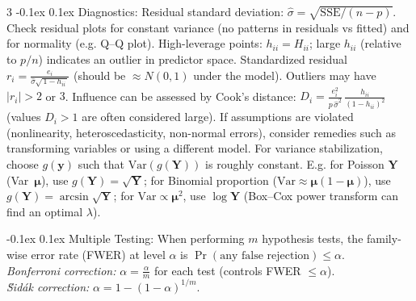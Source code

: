 \documentclass[10pt]{article}
\makeatletter
\renewcommand{\section}{\@startsection{section}{1}{0mm}
  {-0.1ex}%
  {0.1ex}%
  {\normalfont\normalsize\bfseries\color{thm-color}}}
\newcommand{\vect}[1]{\symbf{#1}} %
\makeatother
\begin{document}
\begin{multicols}{3}
  \section{Diagnostics:}
  Residual standard deviation: \( \hat{\sigma} = \sqrt{\mathrm{SSE}/(n-p)}. \)
  Check residual plots for constant variance (no patterns in residuals vs fitted) and for normality (e.g. Q--Q plot).
  High-leverage points: \( h_{ii} = H_{ii} \); large \( h_{ii} \) (relative to \( p/n \)) indicates an outlier in predictor space.
  Standardized residual \( r_i = \frac{e_i}{\hat{\sigma}\sqrt{\,1-h_{ii}\,}} \) (should be \( \approx N(0,1) \) under the model).
  Outliers may have \( |r_i| > 2 \) or \( 3 \).
  Influence can be assessed by Cook's distance: \( D_i = \frac{e_i^2}{p\,\hat{\sigma}^2}\,\frac{h_{ii}}{(1-h_{ii})^2} \) (values \( D_i > 1 \) are often considered large).
  If assumptions are violated (nonlinearity, heteroscedasticity, non-normal errors), consider remedies such as transforming variables or using a different model.
  For variance stabilization, choose \( g(\vect{y}) \) such that \( \mathrm{Var}(g(\vect{Y})) \) is roughly constant.
  E.g. for Poisson \( \vect{Y} \) (Var~\( \vect{\mu} \)), use \( g(\vect{Y})=\sqrt{\vect{Y}} \); for Binomial proportion (\( \mathrm{Var}\approx \vect{\mu}(1-\vect{\mu}) \)), use \( g(\vect{Y})=\arcsin\sqrt{\vect{Y}} \); for \( \mathrm{Var}\propto \vect{\mu}^2 \), use \( \log \vect{Y} \) (Box–Cox power transform can find an optimal \( \lambda \)).

  \section{Multiple Testing:}
  When performing \( m \) hypothesis tests, the family-wise error rate (FWER) at level \( \alpha \) is \( \Pr(\text{any false rejection})\le \alpha. \)\\[0em]
  \textit{Bonferroni correction:} \( \alpha = \frac{\alpha}{m} \) for each test (controls FWER \( \le \alpha \)).\\[0em]
  \textit{S̆idák correction:} \( \alpha = 1 - (1-\alpha)^{1/m} \).\\[0em]

\end{multicols}
\end{document}
